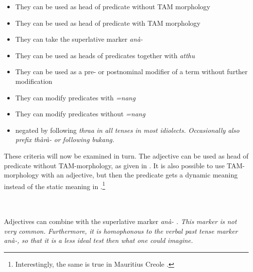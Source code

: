 \begin{itemize}
	\item They can be used as head of predicate without TAM morphology
	\item They can be used as head of predicate  with TAM morphology
	\item They can take the superlative marker \em anà-\em
	\item They can be used as heads of predicates  together with \em atthu\em
	\item They can be used as a pre- or postnominal modifier of a term without further modification
	\item They can modify predicates with  \em =nang \em
	\item They can modify predicates  without \em =nang \em
	\item negated by following \em thraa \em in all tenses in most idiolects. Occasionally also prefix \em thàrà- \em or following \em bukang\em.
\end{itemize}

These criteria will now be examined in turn. The adjective can be used as head of predicate without TAM-morphology, as given in . It is also possible to use TAM-morphology with an adjective, but then the predicate gets a dynamic meaning  instead of the static meaning in .\footnote{Interestingly, the same is true in Mauritius Creole \citet[131]{Alleyne2000}.}



 \\

 \\
Adjectives can combine with the superlative marker \em anà- \em {}. This marker is not very common. Furthermore, it is homophonous to the verbal past tense marker \em anà-\em, so that it is a less ideal test then what one could imagine.

